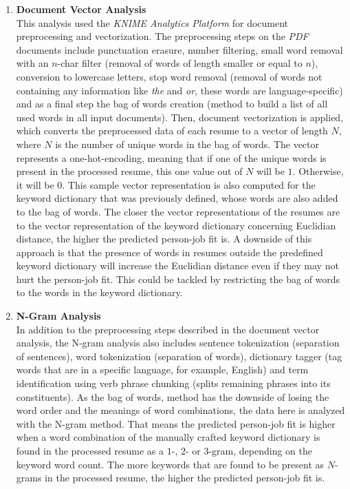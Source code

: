 \documentclass[draft,final]{thesisclass} %
\begin{document}
\begin{enumerate}
    \item \textbf{Document Vector Analysis}\\
    This analysis used the \textit{KNIME Analytics Platform} for document preprocessing and vectorization.
    The preprocessing steps on the \textit{PDF} documents include punctuation erasure, number filtering, small word removal with an $n$-char filter (removal of words of length smaller or equal to $n$), conversion to lowercase letters, stop word removal (removal of words not containing any information like \textit{the} and \textit{or}, these words are language-specific) and as a final step the bag of words creation (method to build a list of all used words in all input documents).
    Then, document vectorization is applied, which converts the preprocessed data of each resume to a vector of length $N$, where $N$ is the number of unique words in the bag of words.
    The vector represents a one-hot-encoding, meaning that if one of the unique words is present in the processed resume, this one value out of $N$ will be $1$. Otherwise, it will be $0$.
    This sample vector representation is also computed for the keyword dictionary that was previously defined, whose words are also added to the bag of words.
    The closer the vector representations of the resumes are to the vector representation of the keyword dictionary concerning Euclidian distance, the higher the predicted person-job fit is.
    A downside of this approach is that the presence of words in resumes outside the predefined keyword dictionary will increase the Euclidian distance even if they may not hurt the person-job fit. 
    This could be tackled by restricting the bag of words to the words in the keyword dictionary.
    \item \textbf{N-Gram Analysis}\\
    In addition to the preprocessing steps described in the document vector analysis, the N-gram analysis also includes sentence tokenization (separation of sentences), word tokenization (separation of words), dictionary tagger (tag words that are in a specific language, for example, English) and term identification using verb phrase chunking (splits remaining phrases into its constituents).
    As the bag of words, method has the downside of losing the word order and the meanings of word combinations, the data here is analyzed with the N-gram method.
    That means the predicted person-job fit is higher when a word combination of the manually crafted keyword dictionary is found in the processed resume as a $1$-, $2$- or $3$-gram, depending on the keyword word count.
    The more keywords that are found to be present as $N$-grams in the processed resume, the higher the predicted person-job fit is.
\end{enumerate}
\end{document}
